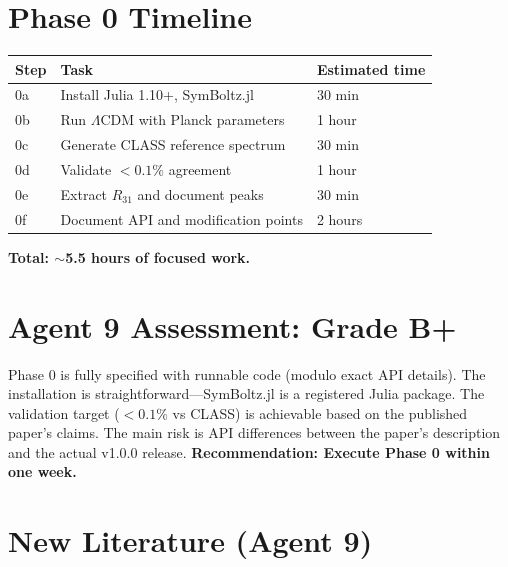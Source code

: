 \documentclass[11pt,a4paper]{article}
\begin{document}
\section{Phase 0 Timeline}

\begin{center}
\begin{tabular}{lll}
\toprule
\textbf{Step} & \textbf{Task} & \textbf{Estimated time} \\
\midrule
0a & Install Julia 1.10+, SymBoltz.jl & 30 min \\
0b & Run $\Lambda$CDM with Planck parameters & 1 hour \\
0c & Generate CLASS reference spectrum & 30 min \\
0d & Validate $< 0.1\%$ agreement & 1 hour \\
0e & Extract $R_{31}$ and document peaks & 30 min \\
0f & Document API and modification points & 2 hours \\
\bottomrule
\end{tabular}
\end{center}

\textbf{Total: $\sim$5.5 hours of focused work.}

\section{Agent 9 Assessment: Grade B+}

Phase 0 is fully specified with runnable code (modulo exact API details). The installation is straightforward---SymBoltz.jl is a registered Julia package. The validation target ($< 0.1\%$ vs CLASS) is achievable based on the published paper's claims. The main risk is API differences between the paper's description and the actual v1.0.0 release. \textbf{Recommendation: Execute Phase 0 within one week.}

\section{New Literature (Agent 9)}
\end{document}
